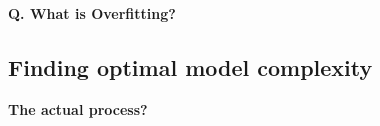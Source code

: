 \begin{frame}[fragile]{\textbf{Q. What is Overfitting?}}
\end{frame}

\subsection{Finding optimal model complexity}
\begin{transitionsubframe}
  \begin{center}
    \Huge \textbf{The actual process?}
  \end{center}
\end{transitionsubframe}

